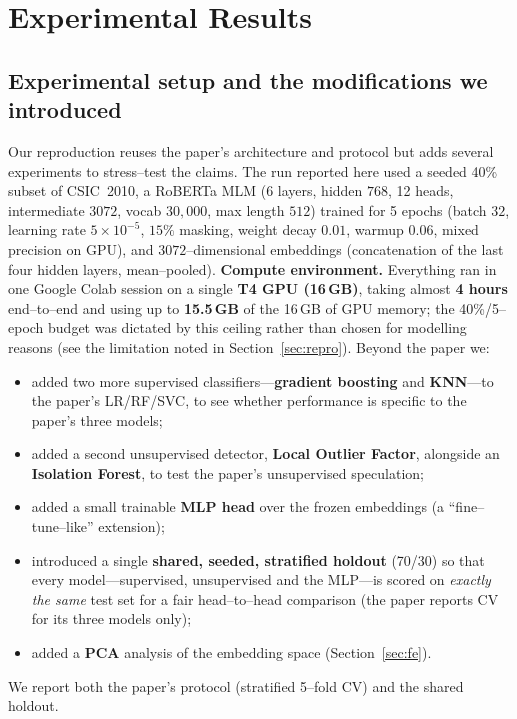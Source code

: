 \documentclass[11pt,a4paper]{article}
\begin{document}
\section{Experimental Results}
\label{sec:results}

\subsection{Experimental setup and the modifications we introduced}
Our reproduction reuses the paper's architecture and protocol but adds several
experiments to stress--test the claims. The run reported here used a seeded 40\% subset of
CSIC~2010, a RoBERTa MLM (6 layers, hidden $768$, 12 heads, intermediate $3072$, vocab
$30{,}000$, max length $512$) trained for 5 epochs (batch $32$, learning rate
$5\times10^{-5}$, $15\%$ masking, weight decay $0.01$, warmup $0.06$, mixed precision on
GPU), and $3072$--dimensional embeddings (concatenation of the last four hidden layers,
mean--pooled). \textbf{Compute environment.} Everything ran in one Google Colab session on
a single \textbf{T4 GPU (16\,GB)}, taking almost \textbf{4 hours} end--to--end and using
up to \textbf{15.5\,GB} of the 16\,GB of GPU memory; the 40\%/5--epoch budget was dictated
by this ceiling rather than chosen for modelling reasons (see the limitation noted in
Section~\ref{sec:repro}). Beyond the paper we:
\begin{itemize}[nosep,leftmargin=1.4em]
  \item added two more supervised classifiers---\textbf{gradient boosting} and
        \textbf{KNN}---to the paper's LR/RF/SVC, to see whether performance is specific to
        the paper's three models;
  \item added a second unsupervised detector, \textbf{Local Outlier Factor}, alongside an
        \textbf{Isolation Forest}, to test the paper's unsupervised speculation;
  \item added a small trainable \textbf{MLP head} over the frozen embeddings (a
        ``fine--tune--like'' extension);
  \item introduced a single \textbf{shared, seeded, stratified holdout} (70/30) so that
        every model---supervised, unsupervised and the MLP---is scored on \emph{exactly
        the same} test set for a fair head--to--head comparison (the paper reports CV for
        its three models only);
  \item added a \textbf{PCA} analysis of the embedding space (Section~\ref{sec:fe}).
\end{itemize}
We report both the paper's protocol (stratified 5--fold CV) and the shared holdout.
\end{document}
